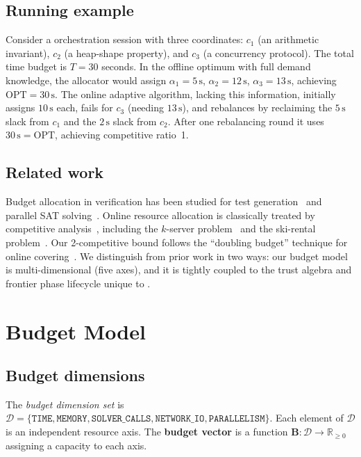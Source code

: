 \documentclass[11pt]{article}
\providecommand{\Bvec}{\mathbf{B}}             %
\providecommand{\Alloc}{\alpha}                %
\providecommand{\OPT}{\mathrm{OPT}}           %
\begin{document}
\subsection{Running example}

Consider a \JuGeo{} orchestration session with three coordinates:
$c_1$ (an arithmetic invariant), $c_2$ (a heap-shape property), and
$c_3$ (a concurrency protocol).  The total time budget is $T = 30$
seconds.  In the offline optimum with full demand knowledge, the
allocator would assign $\Alloc_1 = 5\,\mathrm{s}$,
$\Alloc_2 = 12\,\mathrm{s}$, $\Alloc_3 = 13\,\mathrm{s}$, achieving
$\OPT = 30\,\mathrm{s}$.  The online adaptive algorithm, lacking this
information, initially assigns $10\,\mathrm{s}$ each, fails for $c_3$
(needing $13\,\mathrm{s}$), and rebalances by reclaiming the $5\,\mathrm{s}$
slack from $c_1$ and the $2\,\mathrm{s}$ slack from $c_2$.  After one
rebalancing round it uses $30\,\mathrm{s} = \OPT$, achieving competitive
ratio~1.

\subsection{Related work}

Budget allocation in verification has been studied for test
generation~\cite{budgeting-testing} and parallel SAT
solving~\cite{portfolio-sat}.  Online resource allocation is
classically treated by competitive analysis~\cite{borodin-el-yaniv},
including the $k$-server problem~\cite{k-server} and the
ski-rental problem~\cite{ski-rental}.  Our 2-competitive bound
follows the ``doubling budget'' technique for online
covering~\cite{online-covering}.  We distinguish from prior work
in two ways: our budget model is multi-dimensional (five axes),
and it is tightly coupled to the trust algebra and frontier
phase lifecycle unique to \JuGeo{}.

\section{Budget Model}\label{sec:model}

\subsection{Budget dimensions}

\begin{definition}\label{def:dim}
The \emph{budget dimension set} is $\mathcal{D} = \{\texttt{TIME},
\texttt{MEMORY}, \texttt{SOLVER\_CALLS},
\texttt{NETWORK\_IO}, \texttt{PARALLELISM}\}$.  Each element of
$\mathcal{D}$ is an independent resource axis.  The \textbf{budget
vector} is a function $\Bvec : \mathcal{D} \to \mathbb{R}_{\ge 0}$
assigning a capacity to each axis.
\end{definition}
\end{document}
